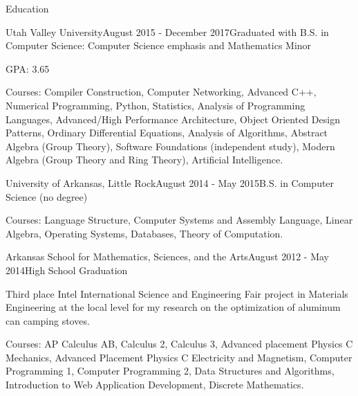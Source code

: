 \documentclass{resume} %
\begin{document}

\begin{rSection}{Education}

  \begin{rSubsection}{Utah Valley University}{August 2015 - December 2017}{Graduated with B.S. in Computer Science: Computer Science emphasis and Mathematics Minor}
  \item GPA: 3.65
  \item Courses: Compiler Construction, Computer Networking, Advanced C++, Numerical Programming, Python, Statistics, Analysis of Programming Languages, Advanced/High Performance Architecture, Object Oriented Design Patterns, Ordinary Differential Equations, Analysis of Algorithms, Abstract Algebra (Group Theory), Software Foundations (independent study), Modern Algebra (Group Theory and Ring Theory), Artificial Intelligence.
  \end{rSubsection}
  
  \begin{rSubsection}{University of Arkansas, Little Rock}{August 2014 - May 2015}{B.S. in Computer Science (no degree)}
  \item Courses: Language Structure, Computer Systems and Assembly Language, Linear Algebra, Operating Systems, Databases, Theory of Computation.
  \end{rSubsection}

  \begin{rSubsection}{Arkansas School for Mathematics, Sciences, and the Arts}{August 2012 - May 2014}{High School Graduation}
  \item Third place Intel International Science and Engineering Fair project in Materials Engineering at the local level for my research on the optimization of aluminum can camping stoves.
  \item Courses: AP Calculus AB, Calculus 2, Calculus 3, Advanced placement Physics C Mechanics, Advanced Placement Physics C Electricity and Magnetism, Computer Programming 1, Computer Programming 2, Data Structures and Algorithms, Introduction to Web Application Development, Discrete Mathematics.
  \end{rSubsection}

\end{rSection}
\end{document}

